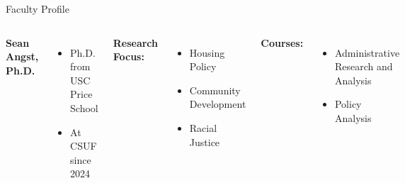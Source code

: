 \documentclass[10pt]{beamer}
\newlength{\imageheight}
\begin{document}
    \begin{frame}{Faculty Profile}
        \begin{columns}[T]
        \textbf{Sean Angst, Ph.D.}
        \begin{itemize}
        \item Ph.D. from USC Price School
        \item At CSUF since 2024
        \end{itemize}
        
        \textbf{Research Focus:}
        \begin{itemize}
        \item Housing Policy
        \item Community Development
        \item Racial Justice
        \end{itemize}
        
        \textbf{Courses:} 
        \begin{itemize}
        \item Administrative Research and Analysis
        \item Policy Analysis
        \end{itemize}
        \vspace*{0.5cm}
        \includegraphics[height=\imageheight]{images/angst.jpg}
        \end{columns}
        \end{frame}
        
\end{document}
